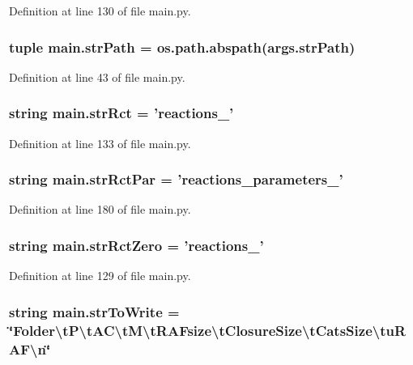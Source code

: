 Definition at line 130 of file main.\-py.

\hypertarget{a00117_ac0b5b603b5f89c10838ce6a42be8c6f7}{
\subsubsection[{str\-Path}]{\setlength{\rightskip}{0pt plus 5cm}tuple main.\-str\-Path = os.\-path.\-abspath(args.\-str\-Path)}}\label{a00117_ac0b5b603b5f89c10838ce6a42be8c6f7}


Definition at line 43 of file main.\-py.

\hypertarget{a00117_a28a37e653a4c0984df32f8d83c3596ff}{
\subsubsection[{str\-Rct}]{\setlength{\rightskip}{0pt plus 5cm}string main.\-str\-Rct = 'reactions\-\_\-'}}\label{a00117_a28a37e653a4c0984df32f8d83c3596ff}


Definition at line 133 of file main.\-py.

\hypertarget{a00117_af48af84bff2351a55727aba6a63c1b52}{
\subsubsection[{str\-Rct\-Par}]{\setlength{\rightskip}{0pt plus 5cm}string main.\-str\-Rct\-Par = 'reactions\-\_\-parameters\-\_\-'}}\label{a00117_af48af84bff2351a55727aba6a63c1b52}


Definition at line 180 of file main.\-py.

\hypertarget{a00117_adbfa32333003aa707723362b43bc11ff}{
\subsubsection[{str\-Rct\-Zero}]{\setlength{\rightskip}{0pt plus 5cm}string main.\-str\-Rct\-Zero = 'reactions\-\_\-'}}\label{a00117_adbfa32333003aa707723362b43bc11ff}


Definition at line 129 of file main.\-py.

\hypertarget{a00117_ab9980383a541b03ce91d6b812a4bf79a}{
\subsubsection[{str\-To\-Write}]{\setlength{\rightskip}{0pt plus 5cm}string main.\-str\-To\-Write = \char`\"{}Folder\textbackslash{}t\-P\textbackslash{}t\-A\-C\textbackslash{}t\-M\textbackslash{}t\-R\-A\-Fsize\textbackslash{}t\-Closure\-Size\textbackslash{}t\-Cats\-Size\textbackslash{}tu\-R\-A\-F\textbackslash{}n\char`\"{}}}\label{a00117_ab9980383a541b03ce91d6b812a4bf79a}


